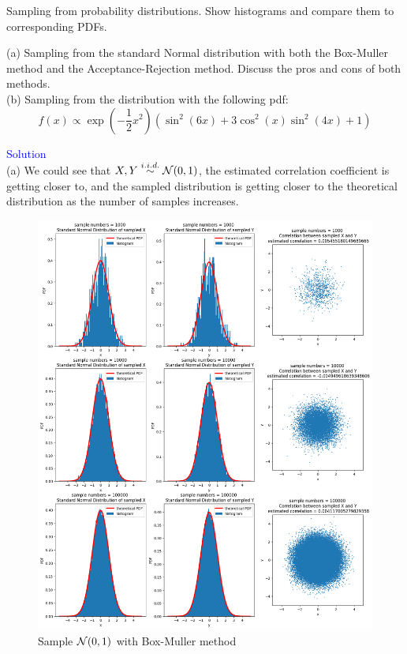 \begin{homeworkProblem}

Sampling from probability distributions. Show histograms and compare them to corresponding PDFs.

(a) Sampling from the standard Normal distribution with both the Box-Muller method and the Acceptance-Rejection method. Discuss the pros and cons of both methods. \\
(b) Sampling from the distribution with the following pdf:
$$f(x) \propto \exp \left(-\frac{1}{2} x^2\right)\left(\sin ^2(6 x)+3 \cos ^2(x) \sin ^2(4 x)+1\right)$$

\textcolor{blue}{Solution} \\

(a)
We could see that $X,Y\stackrel{i.i.d.}{\sim}\mathcal{N}(0,1)$, the estimated correlation coefficient is getting closer to, and the sampled distribution is getting closer to the theoretical distribution as the number of samples increases.\\

\begin{figure}[h]
    \centering
    \includegraphics[height=0.55\textheight]{./figure/p5/box_muller.png}
    \caption{Sample $\mathcal{N}(0,1)$ with Box-Muller method}
\end{figure}



\end{homeworkProblem}

